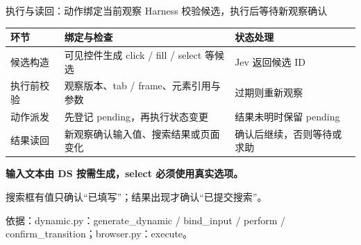 \documentclass[aspectratio=169,11pt]{beamer}
\newcommand{\src}[1]{\par\vfill{\fontsize{6.5}{8}\selectfont\color{Muted}依据：#1\par}}
\newcommand{\lead}[1]{{\large\color{Green}#1}\par\vspace{3mm}}
\newcommand{\key}[1]{\textbf{\color{Green}#1}}
\newcommand{\gap}{\par\vspace{1.8mm}}
\begin{document}
\begin{frame}{执行与读回：动作绑定当前观察}
\lead{Harness 校验候选，执行后等待新观察确认}
\small
\begin{tabularx}{\textwidth}{@{}p{2.5cm}Y>{\raggedright\arraybackslash}p{3.4cm}@{}}\toprule
环节 & 绑定与检查 & 状态处理\\\midrule
候选构造 & 可见控件生成 click / fill / select 等候选 & Jev 返回候选 ID\\[2.4mm]
执行前校验 & 观察版本、tab / frame、元素引用与参数 & 过期则重新观察\\[2.4mm]
动作派发 & 先登记 pending，再执行状态变更 & 结果未明时保留 pending\\[2.4mm]
结果读回 & 新观察确认输入值、搜索结果或页面变化 & 确认后继续，否则等待或求助\\\bottomrule
\end{tabularx}\par
\vspace{3mm}
\key{输入文本由 DS 按需生成，select 必须使用真实选项。}\par\gap
搜索框有值只确认“已填写”；结果出现才确认“已提交搜索”。
\src{dynamic.py：generate\_dynamic / bind\_input / perform / confirm\_transition；browser.py：execute。}
\end{frame}
\end{document}
